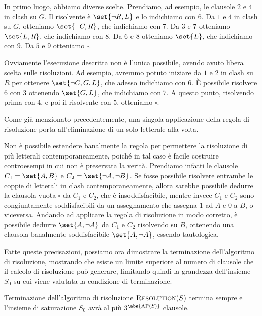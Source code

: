 \begin{example}{}
  In primo luogo, abbiamo diverse scelte. Prendiamo, ad esempio, le clausole \(2\) e \(4\) in clash su \(G\). Il risolvente è \(\set{\neg R, L}\) e lo indichiamo con \(6\).
  Da \(1\) e \(4\) in clash su \(G\), otteniamo \(\set{\neg C, R}\), che indichiamo con \(7\).
  Da \(3\) e \(7\) otteniamo \(\set{L, R}\), che indichiamo con \(8\).
  Da \(6\) e \(8\) otteniamo \(\set{L}\), che indichiamo con \(9\).
  Da \(5\) e \(9\) otteniamo \(\square\).

  Ovviamente l'esecuzione descritta non è l'unica possibile, avendo avuto libera scelta sulle risoluzioni. Ad esempio, avremmo potuto iniziare da \(1\) e \(2\) in clash su \(R\) per ottenere \(\set{\neg C, G, L}\), che adesso indichiamo con \(6\).
  È possibile risolvere \(6\) con \(3\) ottenendo \(\set{G, L}\), che indichiamo con \(7\).
  A questo punto, risolvendo prima con \(4\), e poi il risolvente con \(5\), otteniamo \(\square\).
\end{example}

Come già menzionato precedentemente, una singola applicazione della regola di risoluzione porta all'eliminazione di un solo letterale alla volta.

Non è possibile estendere banalmente la regola per permettere la risoluzione di più letterali contemporaneamente, poiché in tal caso è facile costruire controesempi in cui non è preservata la verità. Prendiamo infatti le clausole \(C_1 = \set{A, B}\) e \(C_2 = \set{\neg A, \neg B}\). Se fosse possibile risolvere entrambe le coppie di letterali in clash contemporaneamente, allora sarebbe possibile dedurre la clausola vuota \(\square\) da \(C_1\) e \(C_2\), che è insoddisfacibile, mentre invece \(C_1\) e \(C_2\) sono congiuntamente soddisfacibili da un assegnamento che assegna \(1\) ad \(A\) e \(0\) a \(B\), o viceversa. Andando ad applicare la regola di risoluzione in modo corretto, è possibile dedurre \(\set{A,\neg A}\) da \(C_1\) e \(C_2\) risolvendo su \(B\), ottenendo una clausola banalmente soddisfacibile \(\set{A, \neg A}\), essendo tautologica.

Fatte queste precisazioni, possiamo ora dimostrare la terminazione dell'algoritmo di risoluzione, mostrando che esiste un limite superiore al numero di clausole che il calcolo di risoluzione può generare, limitando quindi la grandezza dell'insieme \(S_0\) su cui viene valutata la condizione di terminazione.

\begin{theorem}{Terminazione dell'algoritmo di risoluzione}
  \(\textsc{Resolution}(S)\) termina sempre e l'insieme di saturazione \(S_0\) avrà al più \(3^{\abs{\AP[S]}}\) clausole.
\end{theorem}

